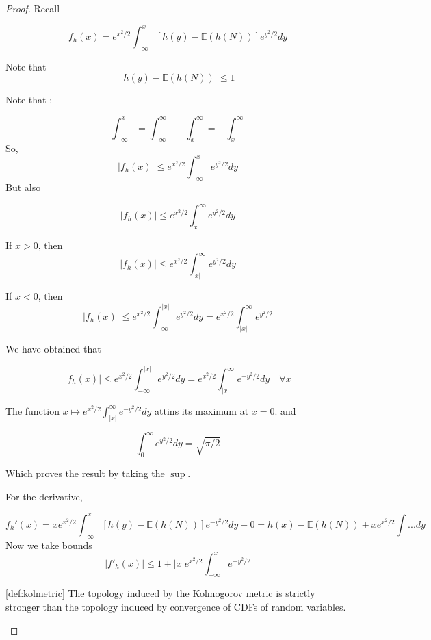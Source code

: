 \begin{proof}
Recall 

\[
    f_h(x) = e^{x^2/2}\int_{-\infty}^x [h(y)-\mathbb{E}(h(N))]e^{y^2/2} dy
\]

Note that 
\[
  |h(y)-\mathbb{E}(h(N))|\le 1
\]

Note that :

\[
  \int_{-\infty}^x = \int_{-\infty}^\infty - \int_x^{\infty} = - \int_x^{\infty}
\]
So, 
\[
  
    |f_h(x)| \le e^{x^2/2}\int_{-\infty}^x e^{y^2/2} dy
\]
But also 

\[
  
    |f_h(x)| \le e^{x^2/2}\int_{x}^\infty e^{y^2/2} dy
\]

If $x>0$, then 
\[
  
    |f_h(x)| \le e^{x^2/2}\int_{|x|}^\infty e^{y^2/2} dy
\]

If $x<0$, then 
\[
  
  |f_h(x)| \le e^{x^2/2}\int_{-\infty}^{|x|} e^{y^2/2} dy = e^{x^2/2}\int_{|x|}^{\infty} e^{y^2/2}  
\]

We have obtained that 

\[
  
  |f_h(x)| \le e^{x^2/2}\int_{-\infty}^{|x|} e^{y^2/2} dy = e^{x^2/2}\int_{|x|}^{\infty} e^{-y^2/2} dy \quad \forall x  
\]

The function $x \mapsto e^{x^2/2}\int_{|x|}^{\infty} e^{-y^2/2} dy$ attins its maximum at $x=0$. and 

\[
  \int_0^\infty e^{y^2/2}dy = \sqrt{\pi/2}
\]

Which proves the result by taking the $\sup$.

For the derivative, 

\[
  f_h'(x) = x e^{x^2/2}\int_{-\infty}^x [h(y)-\mathbb{E}(h(N))]e^{-y^2/2}dy 
  + 0 = h(x)-\mathbb{E}(h(N))+xe^{x^2/2}\int ... dy 
\]
Now we take bounds 
\[
  |f'_h(x)| \le 1 + |x|e^{x^2/2}\int_{-\infty}^x e^{-y^2/2}
\]

\begin{lemma}
  \label{lemma:koltopcdftop}
  \ref{def:kolmetric}
  The topology induced by the Kolmogorov metric is strictly stronger than the topology induced by convergence of CDFs of random variables.
\end{lemma}

\end{proof}
